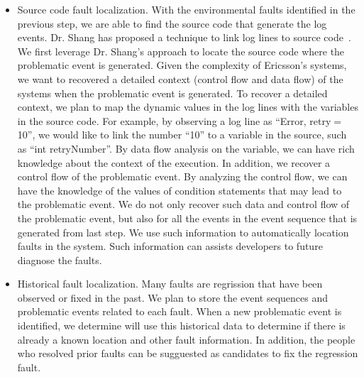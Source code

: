 \begin{enumerate}
\begin{itemize}
		\item {} Source code fault localization. With the environmental faults identified in the previous step, we are able to find the source code that generate the log events. Dr. Shang has proposed a technique to link log lines to source code~\cite{Shang:2014:ULL:2705615.2706065}. We first leverage Dr. Shang's approach to locate the source code where the problematic event is generated. Given the complexity of Ericsson's systems, we want to recovered a detailed context (control flow and data flow) of the systems when the problematic event is generated. To recover a detailed context, we plan to map the dynamic values in the log lines with the variables in the source code. For example, by observing a log line as ``Error, retry$=$10'', we would like to link the number ``10'' to a variable in the source, such as ``int retryNumber''. By data flow analysis on the variable, we can have rich knowledge about the context of the execution. In addition, we recover a control flow of the problematic event. By analyzing the control flow, we can have the knowledge of the values of condition statements that may lead to the problematic event. We do not only recover such data and control flow of the problematic event, but also for all the events in the event sequence that is generated from last step. We use such information to automatically location faults in the system. Such information can assists developers to future diagnose the faults.
		
		\item Historical fault localization. Many faults are regrission that have been observed or fixed in the past. We plan to store the event sequences and problematic events related to each fault. When a new problematic event is identified, we determine will use this historical data to determine if there is already a known location and other fault information. In addition, the people who resolved prior faults can be sugguested as candidates to fix the regression fault.
		
	\end{itemize}
\end{enumerate}

